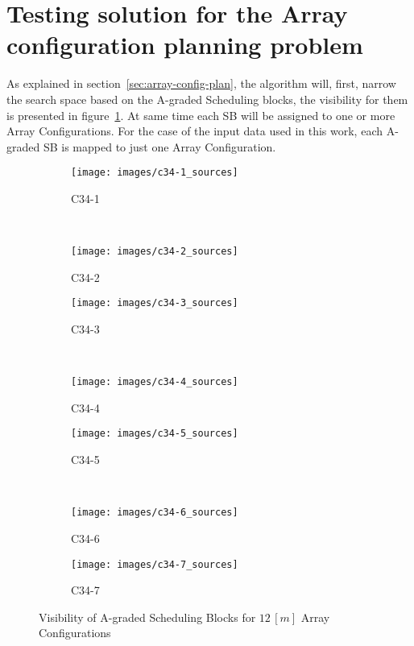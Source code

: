 \section{Testing solution for the Array configuration planning problem} 
As explained in section~\ref{sec:array-config-plan}, the algorithm will, first, narrow the search space based on the A-graded Scheduling blocks, the visibility for them is presented in figure~\ref{fig:results-sb-critical-set}. At same time each SB will be assigned to one or more Array Configurations. For the case of the input data used in this work, each A-graded SB is mapped to just one Array Configuration.

\begin{figure}
        \centering
        \begin{subfigure}[b]{0.45\textwidth}
                \texttt{[image: images/c34-1\_sources]}
                \caption{C34-1} 
        \end{subfigure} 
        ~ %
%
        \begin{subfigure}[b]{0.45\textwidth}
                \texttt{[image: images/c34-2\_sources]}
                \caption{C34-2}
        \end{subfigure}

        \begin{subfigure}[b]{0.45\textwidth}
                \texttt{[image: images/c34-3\_sources]}
                \caption{C34-3}
        \end{subfigure}
        ~ 
        \begin{subfigure}[b]{0.45\textwidth}
                \texttt{[image: images/c34-4\_sources]}
                \caption{C34-4}
        \end{subfigure}%
        
        \begin{subfigure}[b]{0.45\textwidth}
                \texttt{[image: images/c34-5\_sources]}
                \caption{C34-5}
        \end{subfigure}
        ~
        \begin{subfigure}[b]{0.45\textwidth}
                \texttt{[image: images/c34-6\_sources]}
                \caption{C34-6}
        \end{subfigure}
        
        \begin{subfigure}[b]{0.45\textwidth}
                \texttt{[image: images/c34-7\_sources]}
                \caption{C34-7}
        \end{subfigure}           
        \caption{Visibility of A-graded Scheduling Blocks for $12\,[m]$ Array Configurations}
		\label{fig:results-sb-critical-set}
\end{figure}

